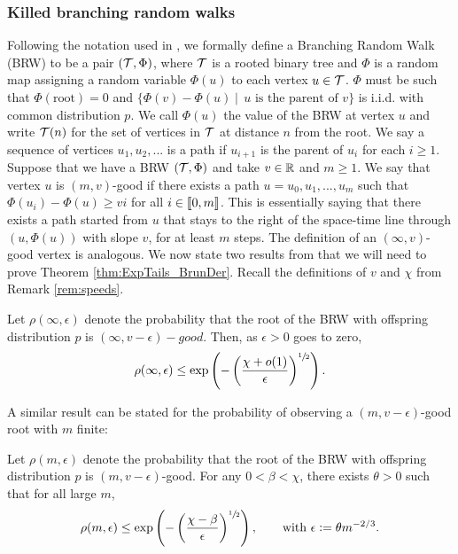 \subsubsection{Killed branching random walks}
Following the notation used in \cite{exp_tails}, we formally define a Branching Random Walk (BRW) to be a pair $(\cal{T}, \Phi)$, where $\cal{T}$ is a rooted binary tree and $\Phi$ is a random map assigning a random variable $\Phi(u)$ to each vertex $u \in \cal{T}$. $\Phi$ must be such that  $\Phi(\text{root}) = 0$ and $\{\Phi(v) - \Phi(u) \mid\, \text{$u$ is the parent of $v$}\}$ is i.i.d. with common distribution $p$. We call $\Phi(u)$ the value of the BRW at vertex $u$ and write $\cal{T}(n)$ for the set of vertices in $\cal{T}$ at distance $n$ from the root. We say a sequence of vertices $u_1, u_2, ...$ is a path if $u_{i+1}$ is the parent of $u_i$ for each $i \geq 1$. \\
Suppose that we have a BRW $(\cal{T}, \Phi)$ and take $v \in \R$ and $m \geq 1$. We say that vertex $u$ is $(m, v)$-good if there exists a path $u = u_0, u_1, ..., u_m$ such that $\Phi(u_i) - \Phi(u) \geq vi$ for all $i \in \bbracket{0,m}$. This is essentially saying that there exists a path started from $u$ that stays to the right of the space-time line through $(u, \Phi(u))$ with slope $v$, for at least $m$ steps. The definition of an $(\infty, v)$-good vertex is analogous. We now state two results from \cite{gantert2008asymptotics} that we will need to prove Theorem \ref{thm:ExpTails_BrunDer}. Recall the definitions of $v$ and $\chi$ from Remark \ref{rem:speeds}. 

\begin{theorem}\label{thm:infty_good}
Let $\rho(\infty, \epsilon)$ denote the probability that the root of the BRW with offspring distribution $p$ is $(\infty, v - \epsilon)-good$. Then, as $\epsilon > 0$ goes to zero, 
\begin{equation}
\rho(\infty, \epsilon) \leq \exp\left( - \left( \frac{\chi + o(1)}{\epsilon} \right)^{\sfrac{1}{2}} \right). 
\end{equation}
\end{theorem}

A similar result can be stated for the probability of observing a $(m, v - \epsilon)$-good root with $m$ finite:
\begin{theorem}
Let $\rho(m, \epsilon)$ denote the probability that the root of the BRW with offspring distribution $p$ is $(m, v - \epsilon)$-good. For any $0 < \beta < \chi$, there exists $\theta > 0$ such that for all large $m$, 
\begin{equation}\label{thm:finite_good}
\rho(m, \epsilon) \leq \exp\left( - \left( \frac{\chi - \beta}{\epsilon} \right)^{\sfrac{1}{2}} \right), \qquad \text{with } \epsilon \defeq \theta m^{-2/3}. 
\end{equation}
\end{theorem}

